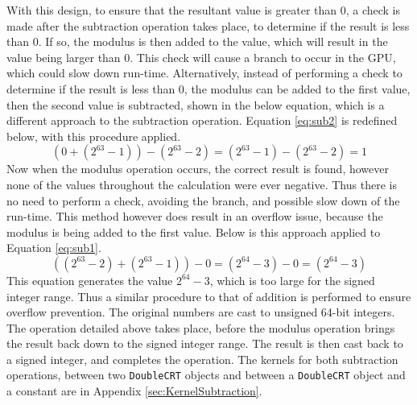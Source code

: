 With this design, to ensure that the resultant value is greater than 0, a check is made after the subtraction operation takes place, to determine if the result is less than 0. If so, the modulus is then added to the value, which will result in the value being larger than 0. This check will cause a branch to occur in the GPU, which could slow down run-time. Alternatively, instead of performing a check to determine if the result is less than 0, the modulus can be added to the first value, then the second value is subtracted, shown in the below equation, which is a different approach to the subtraction operation. Equation \ref{eq:sub2} is redefined below, with this procedure applied. 
\begin{equation}
(0 + (2^{63} - 1)) - (2^{63} - 2) = (2^{63} - 1) - (2^{63} - 2) = 1
\end{equation}
Now when the modulus operation occurs, the correct result is found, however none of the values throughout the calculation were ever negative. Thus there is no need to perform a check, avoiding the branch, and possible slow down of the run-time. This method however does result in an overflow issue, because the modulus is being added to the first value. Below is this approach applied to Equation \ref{eq:sub1}.
\begin{equation}
((2^{63} - 2) + (2^{63} - 1)) - 0 = (2^{64} - 3) - 0 = (2^{64} - 3)
\end{equation}
This equation generates the value $2^{64} - 3$, which is too large for the signed integer range. Thus a similar procedure to that of addition is performed to ensure overflow prevention. The original numbers are cast to unsigned 64-bit integers. The operation detailed above takes place, before the modulus operation brings the result back down to the signed integer range. The result is then cast back to a signed integer, and completes the operation. The kernels for both subtraction operations, between two \verb|DoubleCRT| objects and between a \verb|DoubleCRT| object and a constant are in Appendix \ref{sec:KernelSubtraction}.

